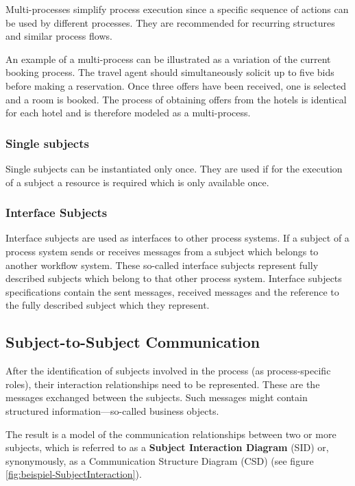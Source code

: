 Multi-processes simplify process execution since a specific sequence of actions can be used by different processes. They are recommended for recurring structures and similar process flows. 

An example of a multi-process can be illustrated as a variation of the current booking process. The travel agent should simultaneously solicit up to five bids before making a reservation. Once three offers have been received, one is selected and a room is booked. The process of obtaining offers from the hotels is identical for each hotel and is therefore modeled as a multi-process.

\subsubsection{Single subjects}

Single subjects can be instantiated only once. They are used if for the execution of a subject a resource is required which is only available once.

\subsubsection{Interface Subjects}

Interface subjects are used as interfaces to other process systems. If a subject of a process system sends or receives messages from a subject which belongs to another workflow system. These so-called interface subjects represent fully described subjects which belong to that other process system. Interface subjects specifications contain the sent messages, received messages and the reference to the fully described subject which they represent.

\subsection{Subject-to-Subject Communication}

After the identification of subjects involved in the process (as process-specific roles), their interaction relationships need to be represented. These are the messages exchanged between the subjects. Such messages might contain structured information—so-called business objects.

The result is a model of the communication relationships between two or more subjects, which is referred to as a \textbf{Subject Interaction Diagram} (SID) or, synonymously, as a Communication Structure Diagram (CSD) (see figure \ref{fig:beispiel-SubjectInteraction}).

